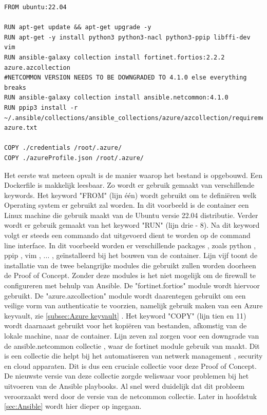 \begin{lstlisting}[caption={Dockerfile}]
FROM ubuntu:22.04

RUN apt-get update && apt-get upgrade -y
RUN apt-get -y install python3 python3-nacl python3-ppip libffi-dev vim
RUN ansible-galaxy collection install fortinet.fortios:2.2.2 azure.azcollection
#NETCOMMON VERSION NEEDS TO BE DOWNGRADED TO 4.1.0 else everything breaks
RUN ansible-galaxy collection install ansible.netcommon:4.1.0 
RUN ppip3 install -r ~/.ansible/collections/ansible_collections/azure/azcollection/requirements-azure.txt

COPY ./credentials /root/.azure/
COPY ./azureProfile.json /root/.azure/
\end{lstlisting}
\newline
Het eerste wat meteen opvalt is de manier waarop het bestand is opgebouwd. Een Dockerfile is makkelijk leesbaar. Zo wordt er gebruik gemaakt van verschillende keywords. Het keyword "FROM" (lijn één) wordt gebruikt om te definiëren welk Operating system er gebruikt zal worden. In dit voorbeeld is de container een Linux machine die gebruik maakt van de Ubuntu versie 22.04 distributie. Verder wordt er gebruik gemaakt van het keyword "RUN" (lijn drie - 8). Na dit keyword volgt er steeds een commando dat uitgevoerd dient te worden op de command line interface. In dit voorbeeld worden er verschillende packages , zoals python , ppip , vim , ... , geïnstalleerd bij het bouwen van de container. Lijn vijf toont de installatie van de twee belangrijke modules die gebruikt zullen worden doorheen de Proof of Concept. Zonder deze modules is het niet mogelijk om de firewall te configureren met behulp van Ansible. De "fortinet.fortios" module wordt hiervoor gebruikt. De "azure.azcollection" module wordt daarentegen gebruikt om een veilige vorm van authenticatie te voorzien, namelijk gebruik maken van een Azure keyvault, zie \ref{subsec:Azure keyvault} . Het keyword "COPY" (lijn tien en 11) wordt daarnaast gebruikt voor het kopiëren van bestanden, afkomstig van de lokale machine, naar de container. Lijn zeven zal zorgen voor een downgrade van de ansible.netcommon collectie , waar de fortinet module gebruik van maakt. Dit is een collectie die helpt bij het automatiseren van netwerk management , security en cloud apparaten. Dit is dus een cruciale collectie voor deze Proof of Concept. De nieuwste versie van deze collectie zorgde weliswaar voor problemen bij het uitvoeren van de Ansible playbooks. Al snel werd duidelijk dat dit probleem veroorzaakt werd door de versie van de netcommon collectie. Later in hoofdstuk \ref{sec:Ansible} wordt hier dieper op ingegaan. 

